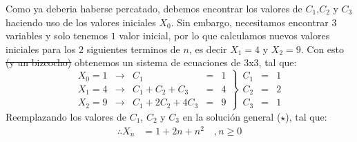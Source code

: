 \begin{solution}
Como ya deberia haberse percatado, debemos encontrar los valores de $C_1$,$C_2$ y $C_3$ haciendo uso de los valores iniciales $X_0$. Sin embargo, necesitamos encontrar $3$ variables y solo tenemos $1$ valor inicial, por lo que calculamos nuevos valores iniciales para los $2$ siguientes terminos de $n$, es decir $X_1=4$ y $X_2=9$. Con esto \st{(y un bizcocho)} obtenemos un sistema de ecuaciones de 3x3, tal que:
$$
  \left.
    \begin{array}{rcrrcr}
      X_0=1 &\rightarrow& C_1 &=&1\\
      X_1=4 &\rightarrow& C_1 +C_2 + C_3 &=&4\\
      X_2=9 &\rightarrow& C_1 + 2C_2+4C_3 &=&9
      \end{array}
  \right\}
  \begin{array}{rcr}
       C_1&=& 1 \\
       C_2&=&2 \\
       C_3&=& 1
  \end{array}
$$
Reemplazando los valores de $C_1$, $C_2$ y $C_3$ en la solución general ($\star$), tal que:
\begin{align*}
    \therefore X_n &= 1 + 2n + n^2 \quad, n\ge0
\end{align*}
\end{solution}